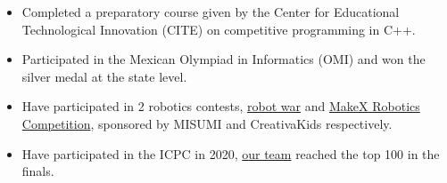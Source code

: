 \documentclass[10pt,a4paper,ragged2e,withhyper]{altacv}
\begin{document}
\begin{paracol}{2}
  \begin{itemize}
    \item Completed a preparatory course given by the Center for Educational Technological Innovation (CITE) on competitive programming in C++.
    \item Participated in the Mexican Olympiad in Informatics (OMI) and won the silver medal at the state level.
  \end{itemize}
  \divider
  \begin{itemize}
    \item Have participated in 2 robotics contests, {\href{https://drive.google.com/file/d/1xETjexZx_X1Bg46y_-m8kKneEbaz48dQ/view?usp=sharing}{\color{blue}robot war\color{black}}} and {\href{https://drive.google.com/file/d/1QcXzJbDVQ1dSvtQrdd_j387KvKlfXH8J/view?usp=sharing}{\color{blue}MakeX Robotics Competition\color{black}}}, sponsored by MISUMI and CreativaKids respectively.
  \end{itemize}
  \divider
  \begin{itemize}
    \item Have participated in the ICPC in 2020, {\href{https://drive.google.com/file/d/1OwYn_YItOoTw_DI-Dajlrwc_oC57Rv6G/view?usp=sharing}{\color{blue}our team\color{black}}} reached the top 100 in the finals.
  \end{itemize}

  \newpage
\end{paracol}
\end{document}
